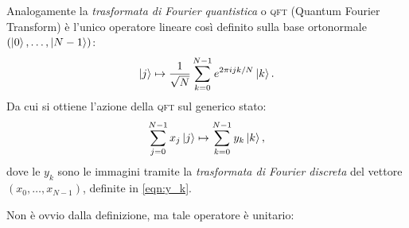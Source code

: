 Analogamente la \textit{trasformata di Fourier quantistica} o \textsc{qft} (Quantum Fourier Transform) è l'unico operatore lineare così definito sulla base ortonormale $\left(\ket{0}, \dotsc, \ket{N-1}\right)$:
\begin{equation}\label{defn:QFT}
 \ket{j} \mapsto \frac{1}{\sqrt{N}} \sum_{k=0}^{N-1} e^{2 \pi i j k/N} \ket{k}.
\end{equation}
Da cui si ottiene l'azione della \textsc{qft} sul generico stato:
\begin{equation}\label{defn:QFT_generica}
 \sum_{j=0}^{N-1}x_j\ket{j} \mapsto \sum_{k=0}^{N-1} y_k \ket{k},
\end{equation}
dove le $y_k$ sono le immagini tramite la \textit{trasformata di Fourier discreta} del vettore $\left(x_0, \dotsc, x_{N-1}\right)$, definite in \eqref{eqn:y_k}.

Non è ovvio dalla definizione, ma tale operatore è unitario:

